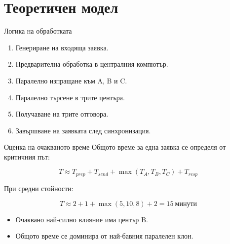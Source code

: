 \documentclass[aspectratio=169]{beamer}
\begin{document}
\section{Теоретичен модел}

\begin{frame}{Логика на обработката}
    \begin{enumerate}
        \item Генериране на входяща заявка.
        \item Предварителна обработка в централния компютър.
        \item Паралелно изпращане към A, B и C.
        \item Паралелно търсене в трите центъра.
        \item Получаване на трите отговора.
        \item Завършване на заявката след синхронизация.
    \end{enumerate}
\end{frame}

\begin{frame}{Оценка на очакваното време}
    Общото време за една заявка се определя от критичния път:

    \[
        T \approx T_{prep} + T_{send} + \max(T_A, T_B, T_C) + T_{resp}
    \]

    При средни стойности:

    \[
        T \approx 2 + 1 + \max(5, 10, 8) + 2 = 15\ \text{минути}
    \]

    \vspace{0.4cm}
    \begin{itemize}
        \item Очаквано най-силно влияние има център B.
        \item Общото време се доминира от най-бавния паралелен клон.
    \end{itemize}
\end{frame}
\end{document}
